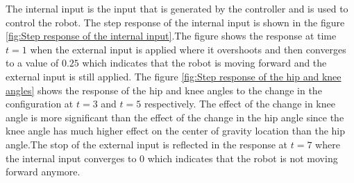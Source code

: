 The internal input is the input that is generated by the controller and is used to control the robot. The step response of the internal input is shown in the figure \ref{fig:Step response of the internal input}.The figure shows the response at time $t=1$ when the external input is applied where it overshoots and then converges to a value of $0.25$ which indicates that the robot is moving forward and the external input is still applied. The figure \ref{fig:Step response of the hip and knee angles} shows the response of the hip and knee angles to the change in the configuration at $t=3$ and $t=5$ respectively. The effect of the change in knee angle is more significant than the effect of the change in the hip angle since the knee angle has much higher effect on the center of gravity location than the hip angle.The stop of the external input is reflected in the response at $t=7$ where the internal input converges to $0$ which indicates that the robot is not moving forward anymore.
